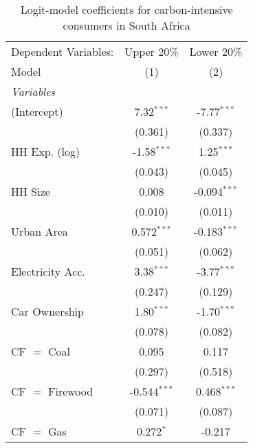
\begin{table}[htbp!]
   \centering
   \small
   \begin{adjustbox}{width = 1\textwidth, max height = 0.95\textheight, center}
      \begin{threeparttable}[b]
         \caption{\label{tab:Logit_1_ZAF} Logit-model coefficients for carbon-intensive consumers in South Africa}
         \begin{tabular}{lcc}
            \tabularnewline \midrule \midrule
            Dependent Variables: & Upper 20\%     & Lower 20\%\\   
            Model                & (1)            & (2)\\  
            \midrule
            \emph{Variables}\\
            (Intercept)          & 7.32$^{***}$   & -7.77$^{***}$\\   
                                 & (0.361)        & (0.337)\\   
            HH Exp. (log)        & -1.58$^{***}$  & 1.25$^{***}$\\   
                                 & (0.043)        & (0.045)\\   
            HH Size              & 0.008          & -0.094$^{***}$\\   
                                 & (0.010)        & (0.011)\\   
            Urban Area           & 0.572$^{***}$  & -0.183$^{***}$\\   
                                 & (0.051)        & (0.062)\\   
            Electricity Acc.     & 3.38$^{***}$   & -3.77$^{***}$\\   
                                 & (0.247)        & (0.129)\\   
            Car Ownership        & 1.80$^{***}$   & -1.70$^{***}$\\   
                                 & (0.078)        & (0.082)\\   
            CF $=$ Coal          & 0.095          & 0.117\\   
                                 & (0.297)        & (0.518)\\   
            CF $=$ Firewood      & -0.544$^{***}$ & 0.468$^{***}$\\   
                                 & (0.071)        & (0.087)\\   
            CF $=$ Gas           & 0.272$^{*}$    & -0.217\\   

\end{tabular}
\end{threeparttable}
\end{adjustbox}
\end{table}
